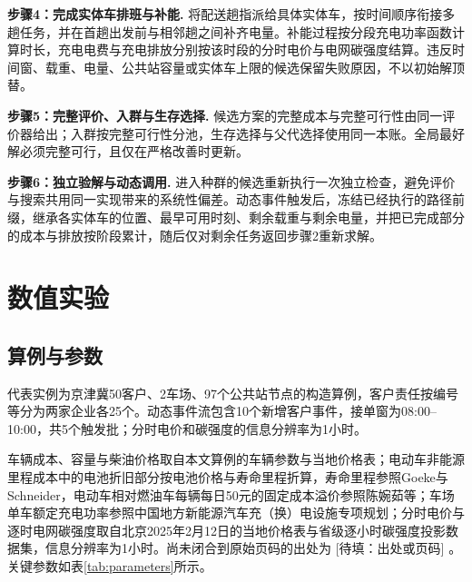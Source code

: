 \documentclass{setp-new}
\DeclareRobustCommand{\TBD}[1]{%
  \begingroup\setlength{\fboxsep}{1.2pt}%
  \colorbox{black!12}{\textcolor{black!65}{\textsf{\footnotesize[待填：#1]}}}%
  \endgroup}
\begin{document}
\textbf{步骤4：完成实体车排班与补能.} 将配送趟指派给具体实体车，按时间顺序衔接多趟任务，并在首趟出发前与相邻趟之间补齐电量。补能过程按分段充电功率函数计算时长，充电电费与充电排放分别按该时段的分时电价与电网碳强度结算。违反时间窗、载重、电量、公共站容量或实体车上限的候选保留失败原因，不以初始解顶替。

\textbf{步骤5：完整评价、入群与生存选择.} 候选方案的完整成本与完整可行性由同一评价器给出；入群按完整可行性分池，生存选择与父代选择使用同一本账。全局最好解必须完整可行，且仅在严格改善时更新。

\textbf{步骤6：独立验解与动态调用.} 进入种群的候选重新执行一次独立检查，避免评价与搜索共用同一实现带来的系统性偏差。动态事件触发后，冻结已经执行的路径前缀，继承各实体车的位置、最早可用时刻、剩余载重与剩余电量，并把已完成部分的成本与排放按阶段累计，随后仅对剩余任务返回步骤2重新求解。


\section{数值实验}

\subsection{算例与参数}

代表实例为京津冀50客户、2车场、97个公共站节点的构造算例，客户责任按编号等分为两家企业各25个。动态事件流包含10个新增客户事件，接单窗为08:00--10:00，共5个触发批；分时电价和碳强度的信息分辨率为1小时。

车辆成本、容量与柴油价格取自本文算例的车辆参数与当地价格表；电动车非能源里程成本中的电池折旧部分按电池价格与寿命里程折算，寿命里程参照Goeke与Schneider\cite{ref:27}，电动车相对燃油车每辆每日50元的固定成本溢价参照陈婉茹等\cite{ref:23}；车场单车额定充电功率参照中国地方新能源汽车充（换）电设施专项规划；分时电价与逐时电网碳强度取自北京2025年2月12日的当地价格表与省级逐小时碳强度投影数据集，信息分辨率为1小时。尚未闭合到原始页码的出处为\TBD{出处或页码}。关键参数如表\ref{tab:parameters}所示。
\end{document}
